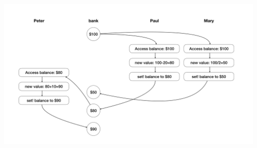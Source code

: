 \documentclass[11pt, oneside]{article}
\begin{document}
\begin{center}
    \includegraphics[width=.8\textwidth,height=.8\textheight,keepaspectratio]{7.png}
\end{center}
\end{document}
